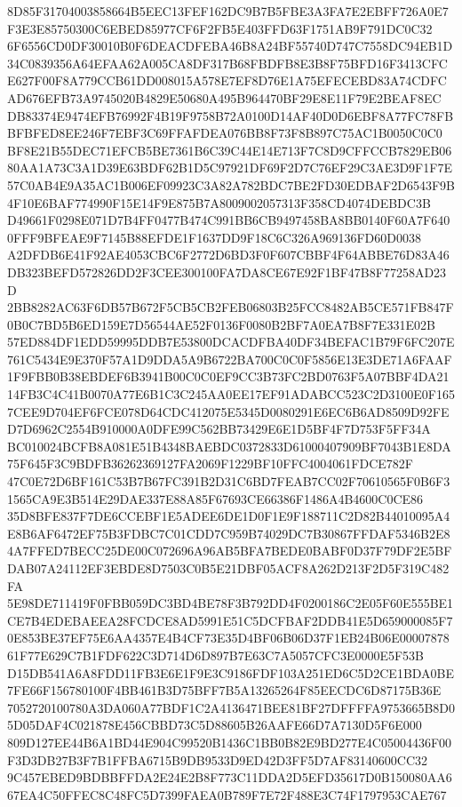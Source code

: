 \documentclass[UTF8,fontset=fandol,zihao=-4,a4paper]{ctexart}
\begin{document}
{{8D85F31704003858664B5EEC13FEF162DC9B7B5FBE3A3FA7E2EBFF726A0E7F3E3E85750300C6EBED85977CF6F2FB5E403FFD63F1751AB9F791DC0C32
6F6556CD0DF30010B0F6DEACDFEBA46B8A24BF55740D747C7558DC94EB1D34C0839356A64EFAA62A005CA8DF317B68FBDFB8E3B8F75BFD16F3413CFC
E627F00F8A779CCB61DD008015A578E7EF8D76E1A75EFECEBD83A74CDFCAD676EFB73A9745020B4829E50680A495B964470BF29E8E11F79E2BEAF8EC
DB83374E9474EFB76992F4B19F9758B72A0100D14AF40D0D6EBF8A77FC78FBBFBFED8EE246F7EBF3C69FFAFDEA076BB8F73F8B897C75AC1B0050C0C0
BF8E21B55DEC71EFCB5BE7361B6C39C44E14E713F7C8D9CFFCCB7829EB0680AA1A73C3A1D39E63BDF62B1D5C97921DF69F2D7C76EF29C3AE3D9F1F7E
57C0AB4E9A35AC1B006EF09923C3A82A782BDC7BE2FD30EDBAF2D6543F9B4F10E6BAF774990F15E14F9E875B7A8009002057313F358CD4074DEBDC3B
D49661F0298E071D7B4FF0477B474C991BB6CB9497458BA8BB0140F60A7F6400FFF9BFEAE9F7145B88EFDE1F1637DD9F18C6C326A969136FD60D0038
A2DFDB6E41F92AE4053CBC6F2772D6BD3F0F607CBBF4F64ABBE76D83A46DB323BEFD572826DD2F3CEE300100FA7DA8CE67E92F1BF47B8F77258AD23D
2BB8282AC63F6DB57B672F5CB5CB2FEB06803B25FCC8482AB5CE571FB847F0B0C7BD5B6ED159E7D56544AE52F0136F0080B2BF7A0EA7B8F7E331E02B
57ED884DF1EDD59995DDB7E53800DCACDFBA40DF34BEFAC1B79F6FC207E761C5434E9E370F57A1D9DDA5A9B6722BA700C0C0F5856E13E3DE71A6FAAF
1F9FBB0B38EBDEF6B3941B00C0C0EF9CC3B73FC2BD0763F5A07BBF4DA2114FB3C4C41B0070A77E6B1C3C245AA0EE17EF91ADABCC523C2D3100E0F165
7CEE9D704EF6FCE078D64CDC412075E5345D0080291E6EC6B6AD8509D92FED7D6962C2554B910000A0DFE99C562BB73429E6E1D5BF4F7D753F5FF34A
BC010024BCFB8A081E51B4348BAEBDC0372833D61000407909BF7043B1E8DA75F645F3C9BDFB36262369127FA2069F1229BF10FFC4004061FDCE782F
47C0E72D6BF161C53B7B67FC391B2D31C6BD7FEAB7CC02F70610565F0B6F31565CA9E3B514E29DAE337E88A85F67693CE66386F1486A4B4600C0CE86
35D8BFE837F7DE6CCEBF1E5ADEE6DE1D0F1E9F188711C2D82B44010095A4E8B6AF6472EF75B3FDBC7C01CDD7C959B74029DC7B30867FFDAF5346B2E8
4A7FFED7BECC25DE00C072696A96AB5BFA7BEDE0BABF0D37F79DF2E5BFDAB07A24112EF3EBDE8D7503C0B5E21DBF05ACF8A262D213F2D5F319C482FA
5E98DE711419F0FBB059DC3BD4BE78F3B792DD4F0200186C2E05F60E555BE1CE7B4EDEBAEEA28FCDCE8AD5991E51C5DCFBAF2DDB41E5D659000085F7
0E853BE37EF75E6AA4357E4B4CF73E35D4BF06B06D37F1EB24B06E0000787861F77E629C7B1FDF622C3D714D6D897B7E63C7A5057CFC3E0000E5F53B
D15DB541A6A8FDD11FB3E6E1F9E3C9186FDF103A251ED6C5D2CE1BDA0BE7FE66F156780100F4BB461B3D75BFF7B5A13265264F85EECDC6D87175B36E
7052720100780A3DA060A77BDF1C2A4136471BEE81BF27DFFFFA9753665B8D05D05DAF4C021878E456CBBD73C5D88605B26AAFE66D7A7130D5F6E000
809D127EE44B6A1BD44E904C99520B1436C1BB0B82E9BD277E4C05004436F00F3D3DB27B3F7B1FFBA6715B9DB9533D9ED42D3FF5D7AF83140600CC32
9C457EBED9BDBBFFDA2E24E2B8F773C11DDA2D5EFD35617D0B150080AA667EA4C50FFEC8C48FC5D7399FAEA0B789F7E72F488E3C74F1797953CAE767
}}
\end{document}
